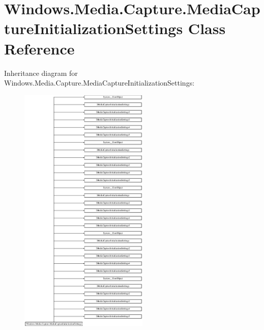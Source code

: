 \hypertarget{class_windows_1_1_media_1_1_capture_1_1_media_capture_initialization_settings}{}\section{Windows.\+Media.\+Capture.\+Media\+Capture\+Initialization\+Settings Class Reference}
\label{class_windows_1_1_media_1_1_capture_1_1_media_capture_initialization_settings}
Inheritance diagram for Windows.\+Media.\+Capture.\+Media\+Capture\+Initialization\+Settings\+:\begin{figure}[H]
\begin{center}
\leavevmode
\includegraphics[height=12.000000cm]{class_windows_1_1_media_1_1_capture_1_1_media_capture_initialization_settings}
\end{center}
\end{figure}
